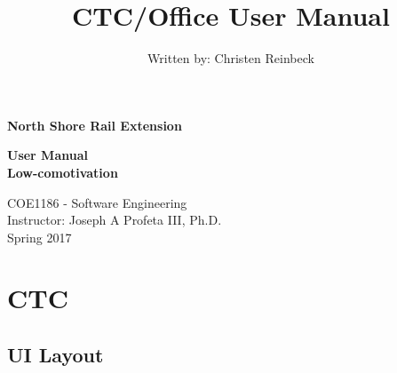 \documentclass[letterpaper]{article}
\begin{document}
	
	\begin{titlepage}
		\begin{center}
			\vspace*{1cm}
			
			\Huge
			\textbf{North Shore Rail Extension}
			
			\vspace{2.5cm}
			\textbf{User Manual \\}
			\vspace{2.5cm}
			\textbf{Low-comotivation}
			\vspace{2.5cm}
			
		\end{center}
		
		\begin{flushright}        
			\Large
		\end{flushright}        
		
		\vfill
		\begin{center}        
			
			\vspace{0.8cm}        
			
			\Large
			COE1186 - Software Engineering\\
			Instructor: Joseph A Profeta III, Ph.D.\\
			Spring 2017
			
		\end{center}
	\end{titlepage}

\cleardoublepage
\setcounter{tocdepth}{1}
\tableofcontents

\begin{center}
	\Large
	\title{CTC/Office User Manual}
	\author {Written by: Christen Reinbeck}
	\date{}	
\end{center}

\maketitle

\section{CTC}

\subsection{UI Layout}
\end{document}
